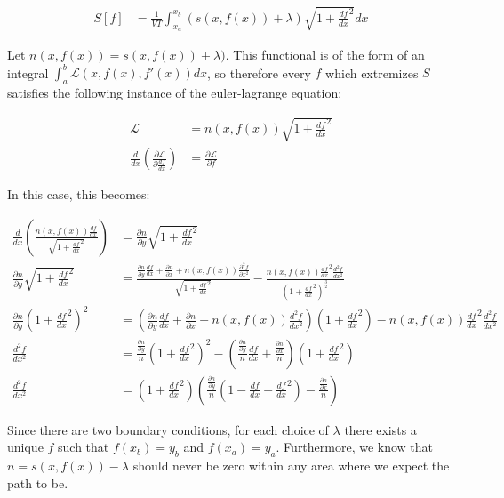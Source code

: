 \documentclass{article}
\begin{document}
\begin{align}
S[f] & = \frac{1}{VT} \int_{x_a}^{x_b} \left( s(x, f(x)) + \lambda \right)
	\sqrt{1 + \frac{df}{dx}^2} dx \label{eq:action}
\end{align}

Let $n(x, f(x)) = s(x, f(x)) + \lambda)$.
This functional is of the form of an integral $\int_a^b \mathcal{L}(x,f(x),f'(x)) dx$,
	so therefore every $f$ which extremizes $S$ satisfies the following
	instance of the euler-lagrange equation:

\begin{align}
\mathcal{L} & = n(x, f(x)) \sqrt{1 + \frac{df}{dx}^2} \\
\frac{d}{dx} \left( \frac{\partial \mathcal{L}}{\partial \frac{df}{dx}} \right)
	& = \frac{\partial \mathcal{L}}{\partial f} \nonumber 
\end{align}

In this case, this becomes:

\begin{align} 
\frac{d}{dx} \left( \frac{n(x, f(x)) \frac{df}{dx}}{\sqrt{1 + \frac{df}{dx}^2}} \right)
	& = \frac{\partial n}{\partial y} \sqrt{1 + \frac{df}{dx}^2} \nonumber\\
\frac{\partial n}{\partial y} \sqrt{1 + \frac{df}{dx}^2} 
& = \frac{\frac{\partial n}{\partial y} \frac{df}{dx} 
		+ \frac{\partial n}{\partial x} 
		+ n(x,f(x)) \frac{\partial^2 f}{\partial x^2}}
	{\sqrt{1 + \frac{df}{dx}^2}}
	- \frac{n(x,f(x)) \frac{df}{dx}^2 \frac{d^2f}{dx^2}}
		{\left( 1 + \frac{df}{dx}^2 \right)^{\frac32}} \nonumber\\
\frac{\partial n}{\partial y} \left(1 + \frac{df}{dx}^2 \right)^2
& = \left( \frac{\partial n}{\partial y} \frac{df}{dx} 
		+ \frac{\partial n}{\partial x} 
		+ n(x,f(x)) \frac{d^2 f}{d x^2} \right)
	\left(1 + \frac{df}{dx}^2\right)
	- n(x,f(x)) \frac{df}{dx}^2 \frac{d^2f}{dx^2} \nonumber\\
\frac{d^2 f}{dx^2}
& = \frac{\frac{\partial n}{\partial y}}{n} \left(1 + \frac{df}{dx}^2 \right)^2
-	\left( \frac{\frac{\partial n}{\partial y}}{n} \frac{df}{dx} 
		+ \frac{\frac{\partial n}{\partial x}}n \right)
	\left(1 + \frac{df}{dx}^2\right) \nonumber\\
\frac{d^2 f}{dx^2}
& = \left( 1 + \frac{df}{dx}^2 \right) \left(
		\frac{\frac{\partial n}{\partial y}}n
		\left( 1 - \frac{df}{dx} + \frac{df}{dx}^2 \right) 
		- \frac{\frac{\partial n}{\partial x}}n
	\right) \nonumber
\end{align}

Since there are two boundary conditions, for each choice of $\lambda$ there
	exists a unique $f$ such that $f(x_b) = y_b$ and $f(x_a) = y_a$.
Furthermore, we know that $n = s(x,f(x)) - \lambda$ should never be zero
	within any area where we expect the path to be.
\end{document}
